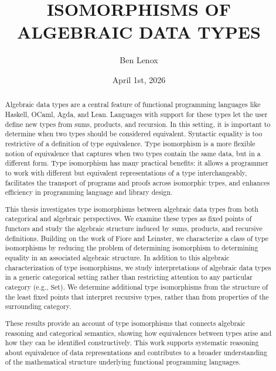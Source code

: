\documentclass{msthesis}
\title{ISOMORPHISMS OF ALGEBRAIC DATA TYPES}
\author{Ben Lenox}
\date{April 1st, 2026}
\theoremstyle{definition}
\newcommand{\Set}{\ensuremath{\mathrm{Set}}}
\begin{document}
\maketitle
\makesignature
\makecopyright

\begin{abstract}
  Algebraic data types are a central feature of functional programming languages like Haskell, OCaml, Agda, and Lean.  Languages with support for these types let the user define new types from sums, products, and recursion.  In this setting, it is important to determine when two types should be considered equivalent.  Syntactic equality is too restrictive of a definition of type equivalence.  Type isomorphism is a more flexible notion of equivalence that captures when two types contain the same data, but in a different form.  Type isomorphism has many practical benefits: it allows a programmer to work with different but equivalent representations of a type interchangeably, facilitates the transport of programs and proofs across isomorphic types, and enhances efficiency in programming language and library design.  
  
  This thesis investigates type isomorphisms between algebraic data types from both categorical and algebraic perspectives.  We examine these types as fixed points of functors and study the algebraic structure induced by sums, products, and recursive definitions.  Building on the work of Fiore and Leinster, we characterize a class of type isomorphisms by reducing the problem of determining isomorphism to determining equality in an associated algebraic structure.  In addition to this algebraic characterization of type isomorphisms, we study interpretations of algebraic data types in a generic categorical setting rather than restricting attention to any particular category (e.g., $\Set$).  We determine additional type isomorphisms from the structure of the least fixed points that interpret recursive types, rather than from properties of the surrounding category.

  These results provide an account of type isomorphisms that connects algebraic reasoning and categorical semantics, showing how equivalences between types arise and how they can be identified constructively.  This work supports systematic reasoning about equivalence of data representations and contributes to a broader understanding of the mathematical structure underlying functional programming languages.
\end{abstract}
\end{document}
